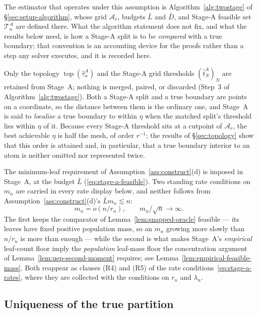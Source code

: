 \documentclass[11pt]{article}
\theoremstyle{plain}
\theoremstyle{definition}
\theoremstyle{remark}
\newcommand{\cA}{\mathcal{A}}
\newcommand{\cT}{\mathcal{T}}
\newcommand{\topol}{\operatorname{top}}
\begin{document}
The estimator that operates under this assumption is
Algorithm~\ref{alg:twostage} of \S\ref{sec:setup-algorithm}, whose grid
$\cA_r$, budgets $\bar L$ and $\bar D$, and Stage-A feasible set
$\cT^A_n$ are defined there. What the algorithm statement does not fix, and
what the results below need, is how a Stage-A split is to be \emph{compared}
with a true boundary; that convention is an accounting device for the proofs
rather than a step any solver executes, and it is recorded here.

Only the topology \(\topol(\hat\tau^A_n)\) and the Stage-A grid thresholds
\((\hat t^A_N)_N\) are retained from Stage~A; nothing is merged, paired, or
discarded (Step~3 of Algorithm~\ref{alg:twostage}). Both a Stage-A split and
a true boundary are points on a coordinate, so the distance between them is
the ordinary one, and Stage~A is said to \emph{localise} a true boundary to
within \(\eta\) when the matched split's threshold lies within \(\eta\) of it.
Because every Stage-A threshold sits at a cutpoint of \(\cA_r\), the best
achievable \(\eta\) is half the mesh, of order \(r^{-1}\); the results of
\S\ref{sec:topology} show that this order is attained and, in particular,
that a true boundary interior to an atom is neither omitted nor represented
twice.

The minimum-leaf requirement of Assumption~\ref{ass:construct}(d) is imposed
in Stage~A, at the budget \(\bar L\)
(\eqref{eq:stage-a-feasible}). Two standing rate conditions on \(m_n\) are
carried in every rate display below, and neither follows from
Assumption~\ref{ass:construct}(d)'s \(\bar Lm_n\lesssim n\):
\[
  m_n=o(n/r_n),
  \qquad
  m_n/\sqrt n\to\infty .
\]
The first keeps the comparator of Lemma~\ref{lem:snapped-oracle} feasible ---
its leaves have fixed positive population mass, so an \(m_n\) growing more
slowly than \(n/r_n\) is more than enough --- while the second is what makes
Stage~A's \emph{empirical} leaf-count floor imply the \emph{population}
leaf-mass floor the concentration argument of
Lemma~\ref{lem:uep-second-moment} requires; see
Lemma~\ref{lem:empirical-feasible-mass}. Both reappear as clauses (R4) and
(R5) of the rate conditions~\eqref{eq:stage-a-rates}, where they are collected
with the conditions on \(r_n\) and \(\lambda_n\).

\subsection{Uniqueness of the true partition}\label{sec:setup-uniqueness}
\end{document}
